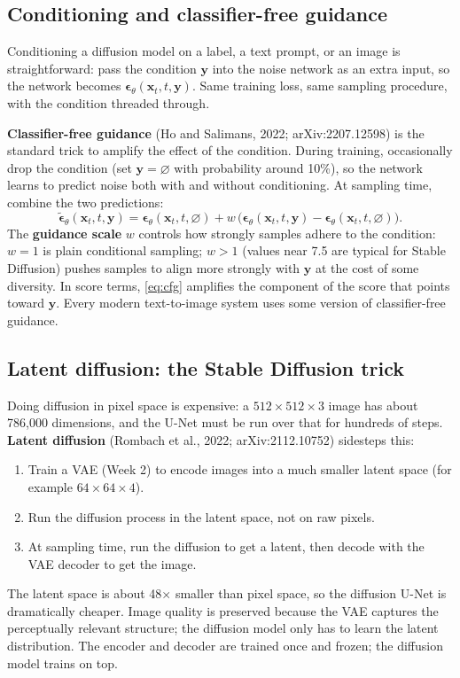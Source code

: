 \documentclass[11pt]{article}
\theoremstyle{remark}
\begin{document}
\subsection{Conditioning and classifier-free guidance}

Conditioning a diffusion model on a label, a text prompt, or an image is straightforward: pass the condition $\mathbf{y}$ into the noise network as an extra input, so the network becomes $\boldsymbol{\epsilon}_\theta(\mathbf{x}_t, t, \mathbf{y})$. Same training loss, same sampling procedure, with the condition threaded through.

\textbf{Classifier-free guidance} (Ho and Salimans, 2022; arXiv:2207.12598) is the standard trick to amplify the effect of the condition. During training, occasionally drop the condition (set $\mathbf{y} = \varnothing$ with probability around 10\%), so the network learns to predict noise both with and without conditioning. At sampling time, combine the two predictions:
\begin{equation}
\tilde{\boldsymbol{\epsilon}}_\theta(\mathbf{x}_t, t, \mathbf{y}) = \boldsymbol{\epsilon}_\theta(\mathbf{x}_t, t, \varnothing) + w\,\big( \boldsymbol{\epsilon}_\theta(\mathbf{x}_t, t, \mathbf{y}) - \boldsymbol{\epsilon}_\theta(\mathbf{x}_t, t, \varnothing) \big).
\label{eq:cfg}
\end{equation}
The \textbf{guidance scale} $w$ controls how strongly samples adhere to the condition: $w = 1$ is plain conditional sampling; $w > 1$ (values near 7.5 are typical for Stable Diffusion) pushes samples to align more strongly with $\mathbf{y}$ at the cost of some diversity. In score terms, \eqref{eq:cfg} amplifies the component of the score that points toward $\mathbf{y}$. Every modern text-to-image system uses some version of classifier-free guidance.

\subsection{Latent diffusion: the Stable Diffusion trick}

Doing diffusion in pixel space is expensive: a $512\times512\times3$ image has about 786{,}000 dimensions, and the U-Net must be run over that for hundreds of steps. \textbf{Latent diffusion} (Rombach et al., 2022; arXiv:2112.10752) sidesteps this:
\begin{enumerate}[leftmargin=1.5em]
\item Train a VAE (Week 2) to encode images into a much smaller latent space (for example $64\times64\times4$).
\item Run the diffusion process in the latent space, not on raw pixels.
\item At sampling time, run the diffusion to get a latent, then decode with the VAE decoder to get the image.
\end{enumerate}
The latent space is about 48$\times$ smaller than pixel space, so the diffusion U-Net is dramatically cheaper. Image quality is preserved because the VAE captures the perceptually relevant structure; the diffusion model only has to learn the latent distribution. The encoder and decoder are trained once and frozen; the diffusion model trains on top.
\end{document}
